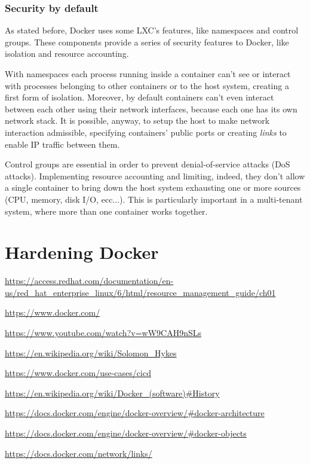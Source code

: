 \documentclass[a4paper,12pt]{article}
\begin{document}
\subsubsection{Security by default}

As stated before, Docker uses some LXC's features, like namespaces and control
groups. These components provide a series of security features to Docker, like
isolation and resource accounting. \par With namespaces each process running
inside a container can't see or interact with processes belonging to other
containers or to the host system, creating a first form of isolation. Moreover,
by default containers can't even interact between each other using their network
interfaces, because each one has its own network stack. It is possible, anyway,
to setup the host to make network interaction admissible, specifying containers'
public ports or creating \textit{links}\cite{legacy_container_links} to enable
IP traffic between them.\par Control groups are essential in order to prevent
denial-of-service attacks (DoS attacks). Implementing resource accounting and
limiting, indeed,  they don't allow a single container to bring down the host
system exhausting one or more sources (CPU, memory, disk I/O, ecc...). This is
particularly important in a multi-tenant system, where more than one container
works together. 


\newpage

\section{Hardening Docker}

\newpage

\begin{thebibliography}{99}

 
\url{https://access.redhat.com/documentation/en-us/red_hat_enterprise_linux/6/html/resource_management_guide/ch01}

\url{https://www.docker.com/}

\url{https://www.youtube.com/watch?v=wW9CAH9nSLs}

\url{https://en.wikipedia.org/wiki/Solomon_Hykes}

\url{https://www.docker.com/use-cases/cicd}

\url{https://en.wikipedia.org/wiki/Docker_(software)#History}

\url{https://docs.docker.com/engine/docker-overview/#docker-architecture}

\url{https://docs.docker.com/engine/docker-overview/#docker-objects}

\url{https://docs.docker.com/network/links/}

\end{thebibliography}
\end{document}
